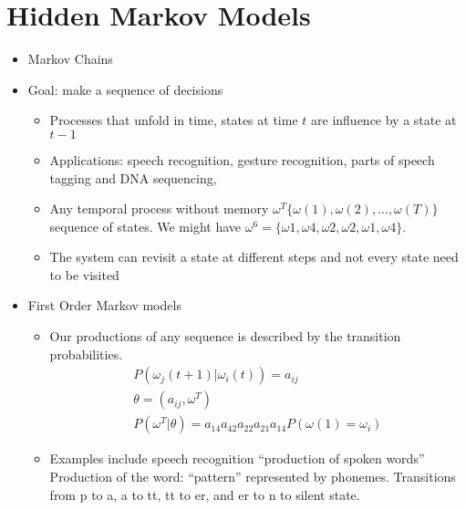 \section{Hidden Markov Models}

\begin{itemize}
	\item Markov Chains
	\item Goal: make a sequence of decisions
	\begin{itemize}
		\item Processes that unfold in time, states at time $t$ are influence by a state at $t-1$
		\item Applications: speech recognition, gesture recognition, parts of speech tagging and DNA sequencing, 
		\item Any temporal process without memory $\omega ^T \{ \omega(1),\omega(2), ..., \omega(T) \}$ sequence of states.  We might have $\omega^6 = \{ \omega 1, \omega 4, \omega 2, \omega 2, \omega 1, \omega 4  \}$.
		\item The system can revisit a state at different steps and not every state need to be visited 
	\end{itemize}
	\item First Order Markov models
	\begin{itemize}
		\item Our productions of any sequence is described by the transition probabilities. 
		\begin{eqnarray}
			P( \omega_j (t+1) | \omega_i (t)) = a_{ij} \\
			\theta = ( a_ {ij} , \omega^T) \\
			P(\omega^T | \theta) = a_{14} a_{42} a_{22} a_{21} a_{14} P(\omega(1) = \omega_i)
		\end{eqnarray}
		\item Examples include speech recognition
		``production of spoken words''  Production of the word: ``pattern'' represented by phonemes.
		Transitions from p to a, a to tt, tt to er, and er to n to silent state.  
	\end{itemize}
	
\end{itemize}


